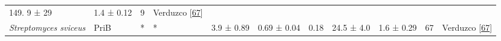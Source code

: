 \documentclass[12pt,twoside]{reedthesis}
\begin{document}
\begin{longtable}[]{@{}lllllllllll@{}}
\begin{minipage}[t]{0.05\columnwidth}
  149. 9 ± 29\strut
  \end{minipage} & \begin{minipage}[t]{0.05\columnwidth}\raggedright\strut
  1.4 ± 0.12\strut
  \end{minipage} & \begin{minipage}[t]{0.03\columnwidth}\raggedright\strut
  9\strut
  \end{minipage} & \begin{minipage}[t]{0.11\columnwidth}\raggedright\strut
  Verduzco
  {[}\protect\hyperlink{ref-verduzco-castro_co-occurrence_2016}{67}{]}\strut
  \end{minipage}\tabularnewline
  \begin{minipage}[t]{0.15\columnwidth}\raggedright\strut
  \emph{Streptomyces sviceus}\strut
  \end{minipage} & \begin{minipage}[t]{0.05\columnwidth}\raggedright\strut
  PriB\strut
  \end{minipage} & \begin{minipage}[t]{0.04\columnwidth}\raggedright\strut
  *\strut
  \end{minipage} & \begin{minipage}[t]{0.04\columnwidth}\raggedright\strut
  *\strut
  \end{minipage} & \begin{minipage}[t]{0.06\columnwidth}\raggedright\strut
  3.9 ± 0.89\strut
  \end{minipage} & \begin{minipage}[t]{0.06\columnwidth}\raggedright\strut
  0.69 ± 0.04\strut
  \end{minipage} & \begin{minipage}[t]{0.06\columnwidth}\raggedright\strut
  0.18\strut
  \end{minipage} & \begin{minipage}[t]{0.05\columnwidth}\raggedright\strut
  24.5 ± 4.0\strut
  \end{minipage} & \begin{minipage}[t]{0.05\columnwidth}\raggedright\strut
  1.6 ± 0.29\strut
  \end{minipage} & \begin{minipage}[t]{0.03\columnwidth}\raggedright\strut
  67\strut
  \end{minipage} & \begin{minipage}[t]{0.11\columnwidth}\raggedright\strut
  Verduzco
  {[}\protect\hyperlink{ref-verduzco-castro_co-occurrence_2016}{67}{]}\strut
  \end{minipage}\tabularnewline

\end{longtable}
\end{document}
